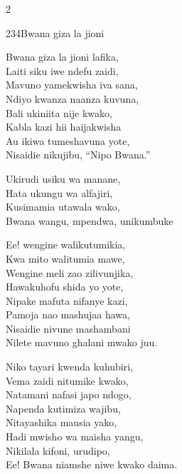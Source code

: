 \documentclass{article}
\begin{document}
\begin{multicols}{2}
\begin{hymn}{234}{Bwana giza la jioni}{}
\begin{stanza}
Bwana giza la jioni lafika,\\
Laiti siku iwe ndefu zaidi,\\
Mavuno yamekwisha iva sana,\\
Ndiyo kwanza naanza kuvuna,\\
Bali ukiniita nije kwako,\\
Kabla kazi hii haijakwisha\\
Au ikiwa tumeshavuna yote,\\
Nisaidie nikujibu, ``Nipo Bwana.''
\end{stanza}
\begin{chorus}
Ukirudi usiku wa manane,\\
Hata ukungu wa alfajiri,\\
Kusimamia utawala wako,\\
Bwana wangu, mpendwa, unikumbuke
\end{chorus}
\begin{stanza}
Ee! wengine walikutumikia,\\
Kwa mito walitumia mawe,\\
Wengine meli zao zilivunjika,\\
Hawakuhofu shida yo yote,\\
Nipake mafuta nifanye kazi,\\
Pamoja nao mashujaa hawa,\\
Nisaidie nivune mashambani\\
Nilete mavuno ghalani mwako juu.
\end{stanza}
\begin{stanza}
Niko tayari kwenda kuhubiri,\\
Vema zaidi nitumike kwako,\\
Natamani nafasi japo ndogo,\\
Napenda kutimiza wajibu,\\
Nitayashika mausia yako,\\
Hadi mwisho wa maisha yangu,\\
Nikilala kifoni, urudipo,\\
Ee! Bwana niamshe niwe kwako daima.
\end{stanza}
\end{hymn}


\end{multicols}
\end{document}
